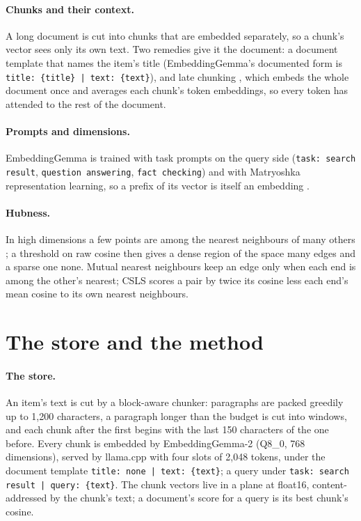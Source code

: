 \documentclass[11pt]{article}
\theoremstyle{plain}
\theoremstyle{definition}
\theoremstyle{remark}
\newcommand{\code}[1]{\texttt{#1}}
\begin{document}
\paragraph{Chunks and their context.} A long document is cut into chunks that are embedded
separately, so a chunk's vector sees only its own text. Two remedies give it the document: a
document template that names the item's title (EmbeddingGemma's documented form is
\code{title: \{title\} | text: \{text\}}), and late chunking \citep{gunther2024late}, which embeds
the whole document once and averages each chunk's token embeddings, so every token has attended to
the rest of the document.

\paragraph{Prompts and dimensions.} EmbeddingGemma is trained with task prompts on the query side
(\code{task: search result}, \code{question answering}, \code{fact checking}) and with Matryoshka
representation learning, so a prefix of its vector is itself an embedding
\citep{vera2025embeddinggemma,kusupati2022matryoshka}.

\paragraph{Hubness.} In high dimensions a few points are among the nearest neighbours of many
others \citep{radovanovic2010hubs}; a threshold on raw cosine then gives a dense region of the
space many edges and a sparse one none. Mutual nearest neighbours keep an edge only when each end
is among the other's nearest; CSLS \citep{conneau2018word} scores a pair by twice its cosine less
each end's mean cosine to its own nearest neighbours.

\section{The store and the method}\label{sec:method}

\paragraph{The store.} An item's text is cut by a block-aware chunker: paragraphs are packed
greedily up to 1{,}200 characters, a paragraph longer than the budget is cut into windows, and
each chunk after the first begins with the last 150 characters of the one before. Every chunk is
embedded by EmbeddingGemma-2 (Q8\_0, 768 dimensions), served by llama.cpp
\citep{gerganov2023llamacpp} with four slots of 2{,}048 tokens, under the document template
\code{title: none | text: \{text\}}; a query under \code{task: search result | query: \{text\}}.
The chunk vectors live in a plane at float16, content-addressed by the chunk's text; a document's
score for a query is its best chunk's cosine.
\end{document}
